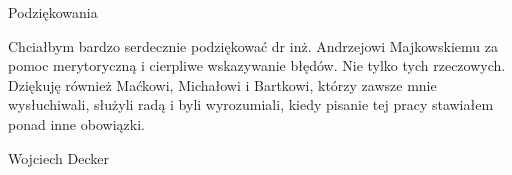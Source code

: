 \noindent
{\Large Podziękowania}
\bigskip

Chciałbym bardzo serdecznie podziękować dr inż. Andrzejowi Majkowskiemu za pomoc merytoryczną i cierpliwe wskazywanie błędów. Nie tylko tych rzeczowych.
Dziękuję również Maćkowi, Michałowi i Bartkowi, którzy zawsze mnie wysłuchiwali, służyli radą i byli wyrozumiali, kiedy pisanie tej pracy stawiałem ponad inne obowiązki.

\bigskip

{\raggedleft
Wojciech Decker
}

